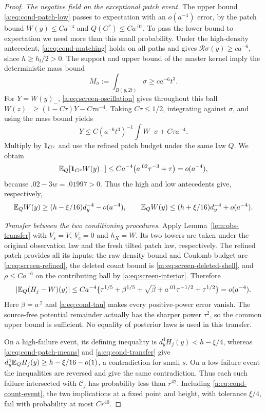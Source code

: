 \begin{proof}
\emph{The negative field on the exceptional patch event.}
The upper bound \eqref{a:eq:cond-patch-low} passes to expectation
with an $o(a^{-4})$ error, by the patch bound $W(y)\le Ca^{-4}$
and $Q(G^c)\le Ca^{.01}$. To pass the lower bound to expectation
we need more than this small probability. Under the high-density
antecedent, \eqref{a:eq:cond-matching} holds on all paths and gives
$\mathcal R\sigma(y)\ge ca^{-6}$, since $h\ge h_l/2>0$.
The support and upper bound of the master kernel imply the
deterministic mass bound
\[
 M_\sigma:=\int_{B(y,2t)}\sigma\ge ca^{-6}t^3.
\]
For $Y=W(y)_-$, \eqref{a:eq:screen-oscillation} gives throughout this
ball
$W(z)_-\ge(1-C\tau)Y-C\tau a^{-4}$.
Taking $C\tau\le1/2$, integrating against $\sigma$, and using the
mass bound yields
\[
 Y\le C(a^{-6}t^3)^{-1}\int W_-\sigma+C\tau a^{-4}.
\]
Multiply by $\mathbf 1_{G^c}$ and use the refined patch budget under the
same law $Q$. We obtain
\begin{equation}\label{a:eq:cond-negative-exception}
 \mathbb E_Q[\mathbf 1_{G^c}W(y)_-]
  \le Ca^{-4}\big(a^{.02}\tau^{-3}+\tau\big)=o(a^{-4}),
\end{equation}
because $.02-3w=.01997>0$. Thus the high and low antecedents give,
respectively,
\begin{equation}\label{a:eq:cond-patch-means}
 \mathbb E_QW(y)\ge(h-\xi/16)d_y^{-4}-o(a^{-4}),\qquad
 \mathbb E_QW(y)\le(h+\xi/16)d_y^{-4}+o(a^{-4}).
\end{equation}


\emph{Transfer between the two conditioning procedures.}
Apply Lemma~\ref{lem:obs-transfer} with $V_s=V$, $V_c=0$ and
$h_X=W$. Its two towers are taken under the original observation law
and the fresh tilted patch law, respectively. The refined patch provides
all its inputs: the raw density bound and Coulomb budget are
\eqref{a:eq:screen-refined}, the deleted count bound is
\eqref{m:eq:screen-deleted-shell}, and $\rho\le Ca^{-6}$ on the
contributing ball by \eqref{a:eq:screen-interior}. Therefore
\begin{equation}\label{a:eq:cond-transfer}
 |\mathbb E_Q(H_j-W)(y)|
 \le Ca^{-4}\{\tau^{1/5}+\beta^{1/5}+\sqrt\beta
             +a^{.01}\tau^{-1/2}+\tau^{1/2}\}=o(a^{-4}).
\end{equation}
Here $\beta=a^{.2}$ and \eqref{a:eq:cond-tau} makes every positive-power
error vanish. The source-free potential remainder actually has the sharper
power $\tau^2$, so the common upper bound is sufficient. No equality of
posterior laws is used in this transfer.

On a high-failure event, its defining inequality is
$d_y^4H_j(y)<h-\xi/4$, whereas
\eqref{a:eq:cond-patch-means} and \eqref{a:eq:cond-transfer} give
$d_y^4\mathbb E_QH_j(y)\ge h-\xi/16-o(1)$, a contradiction for small
$s$. On a low-failure event the inequalities are reversed and
give the same contradiction. Thus each such failure intersected
with $\mathcal C_j$ has probability less than $r^{42}$. Including
\eqref{a:eq:cond-count-event}, the two implications at a fixed
point and height, with tolerance $\xi/4$, fail with probability
at most $Cr^{40}$.


\end{proof}

